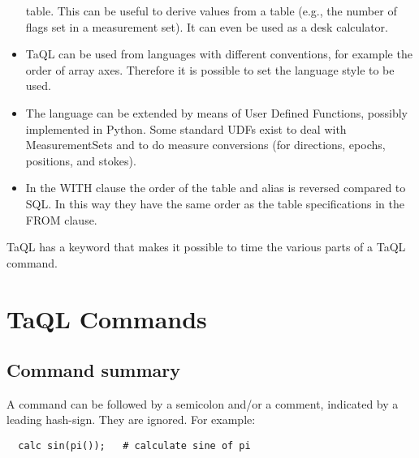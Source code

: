 \begin{itemize}
table. This can be useful to derive values from a table (e.g., the
number of flags set in a measurement set). It can even be used as a
desk calculator.
\item TaQL can be used from languages with different conventions, for
example the order of array axes. Therefore it is possible to set the
language style to be used.
\item The language can be extended by means of User Defined
  Functions, possibly implemented in Python.
  Some standard UDFs exist to deal with MeasurementSets and to do
  measure conversions (for directions, epochs, positions, and stokes).
\item In the WITH clause the order of the table and alias is reversed
  compared to SQL. In this way they have the same order as the table
  specifications in the FROM clause.
\end{itemize}
TaQL has a keyword that makes it possible to time the various parts of
a TaQL command.


\section{TaQL Commands}
\subsection{Command summary}
A command can be followed by a semicolon and/or a comment, indicated
by a leading hash-sign. They are ignored. For example:
\begin{verbatim}
  calc sin(pi());   # calculate sine of pi
\end{verbatim}

